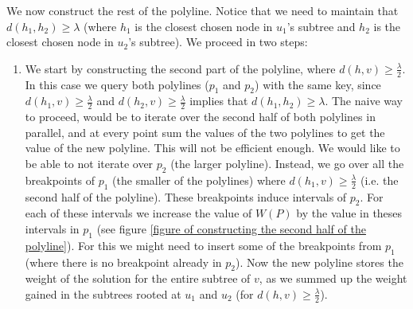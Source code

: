 \documentclass[11pt,a4paper]{article}
\theoremstyle{definition}
\theoremstyle{remark}
\begin{document}
We now construct the rest of the polyline. Notice that we need to maintain that $d(h_1,h_2) \geq \lambda$ (where $h_1$ is the closest chosen node in $u_1$'s subtree and $h_2$ is the closest chosen node in $u_2$'s subtree). We proceed in two steps:

\begin{enumerate}
\item We start by constructing the second part of the polyline, where $d(h,v) \geq \frac{\lambda}{2}$. In this case we query both polylines ($p_1$ and $p_2$) with the same key, since $d(h_1,v) \geq \frac{\lambda}{2}$ and $d(h_2,v) \geq \frac{\lambda}{2}$ implies that $d(h_1,h_2) \geq \lambda$. The naive way to proceed, would be to iterate over the second half of both polylines in parallel, and at every point sum the values of the two polylines to get the value of the new polyline. This will not be efficient enough. We would like to be able to not iterate over $p_2$ (the larger polyline). Instead, we go over all the breakpoints of $p_1$ (the smaller of the polylines) where $d(h_1,v)\geq \frac{\lambda}{2}$ (i.e. the second half of the polyline). These breakpoints induce intervals of $p_2$. For each of these intervals we increase the value of $W(P)$ by the value in theses intervals in $p_1$ (see figure \ref{figure of constructing the second half of the polyline}). For this we might need to insert some of the breakpoints from $p_1$ (where there is no breakpoint already in $p_2$). Now the new polyline stores the weight of the solution for the entire subtree of $v$, as we summed up the weight gained in the subtrees rooted at $u_1$ and $u_2$ (for $d(h,v) \geq \frac{\lambda}{2}$). 


\end{enumerate}
\end{document}
